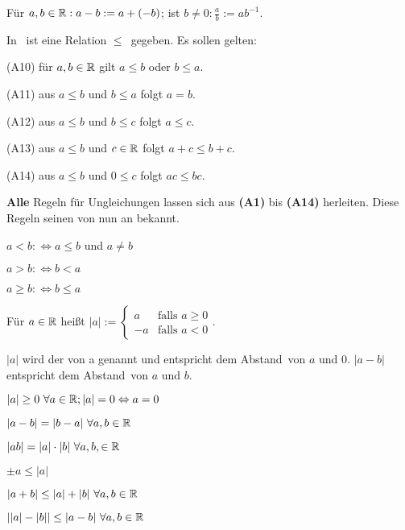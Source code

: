 \documentclass[a4paper,oneside,DIV15,BCOR12mm]{scrbook}
\begin{document}
\begin{schreibweisen}
Für $a,b \in\mathbb{R}: a - b := a+ (-b)$; ist $b \neq 0: \frac{a}{b} := ab^{-1}$.
\end{schreibweisen}

\begin{axiom}[Anordnungsaxiome]
In \MdR\ ist eine Relation \glqq$\le$\grqq\ gegeben. Es sollen gelten:
\begin{liste}
\item[(A10)] für $a,b\in\mathbb{R}$ gilt $a\le b$ oder $b \le a$.
\item[(A11)] aus $a \le b$ und $b \le a $ folgt $a = b$.
\item[(A12)] aus $a \le b$ und $b \le c $ folgt $a \le c$.
\item[(A13)] aus $a \le b$ und $c \in \mathbb{R}$ folgt $a+c \le b+c$.
\item[(A14)] aus $a \le b$ und $0 \le c$ folgt $ac \le bc$.
\end{liste}
\end{axiom}

\textbf{Alle} Regeln für Ungleichungen lassen sich aus \textbf{(A1)} bis \textbf{(A14)} herleiten. Diese Regeln seinen von nun an bekannt.

\begin{schreibweisen}
\begin{liste}
\item $a < b :\Leftrightarrow a \le b $ und $a \ne b$
\item $a > b :\Leftrightarrow b < a$
\item $a \ge b :\Leftrightarrow b \le a$
\end{liste}
\end{schreibweisen}

\begin{definition}[Betrag]
Für $a \in \mathbb{R}$ heißt $ |a| := 
\begin{cases}
 a & \mbox{falls } a \ge 0 \\
-a & \mbox{falls } a < 0
\end{cases} $. 

$|a|$ wird der  von a genannt und entspricht dem \glqq Abstand\grqq\ von $a$ und $0$. $|a-b|$ entspricht dem \glqq Abstand\grqq\ von $a$ und $b$.
\end{definition}

\begin{satz}[Betragssätze]
\begin{liste}
\item $|a| \ge 0 \ \forall a \in \mathbb{R}; |a|= 0 \Leftrightarrow a = 0$
\item $|a-b| = |b-a| \ \forall a,b \in \mathbb{R}$
\item $|ab|  = |a| \cdot |b| \ \forall a,b, \in \mathbb{R}$
\item $\pm a \le |a|$
\item $|a+b| \le |a|+|b| \ \forall a,b \in \mathbb{R}$
\item $||a| - |b|| \le |a - b| \ \forall a,b \in \mathbb{R}$
\end{liste}
\end{satz}
\end{document}
